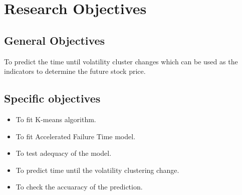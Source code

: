 \documentclass[twoside,a4paper,12pt]{article}
\begin{document}
\section*{Research Objectives} 
\subsection*{General Objectives}To predict the time until volatility cluster changes which can be used as the indicators to determine the future stock price.
\subsection*{Specific objectives}
\begin{itemize}
	\item To fit  K-means algorithm.
	\item To fit   Accelerated Failure Time model.
	\item  To test adequacy of the model.
	\item To predict  time until the volatility clustering change.
	\item To check the accuaracy of the prediction.
	
	
\end{itemize}
\end{document}
